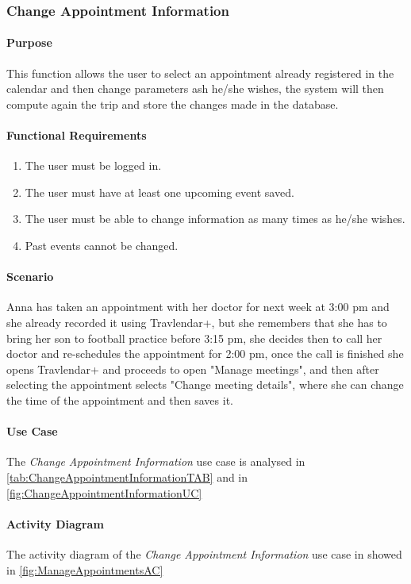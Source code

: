 \clearpage
\subsubsection{Change Appointment Information}
\label{ChangeAppointmentInformation}
\paragraph*{Purpose\\}
This function allows the user to select an appointment already registered in the calendar and then change parameters ash he/she wishes, the system will then compute again the trip and store the changes made in the database.
\paragraph*{Functional Requirements}
\begin{enumerate}[label=R.\arabic*:,resume]
	\item The user must be logged in.
	\item The user must have at least one upcoming event saved.
	\item The user must be able to change information as many times as he/she wishes.
	\item Past events cannot be changed.
\end{enumerate}

\paragraph*{Scenario\\}
Anna has taken an appointment with her doctor for next week at 3:00 pm and she already recorded it using Travlendar+, but she remembers that she has to bring her son to football practice before 3:15 pm, she decides then to call her doctor and re-schedules the appointment for 2:00 pm, once the call is finished she opens Travlendar+ and proceeds to open "Manage meetings", and then after selecting the appointment selects "Change meeting details", where she can change the time of the appointment and then saves it.
\paragraph*{Use Case\\}
The \emph{Change Appointment Information} use case is analysed in \autoref{tab:ChangeAppointmentInformationTAB} and in \autoref{fig:ChangeAppointmentInformationUC}
\paragraph*{Activity Diagram\\}
The activity diagram of the \emph{Change Appointment Information} use case in showed in \autoref{fig:ManageAppointmentsAC}
